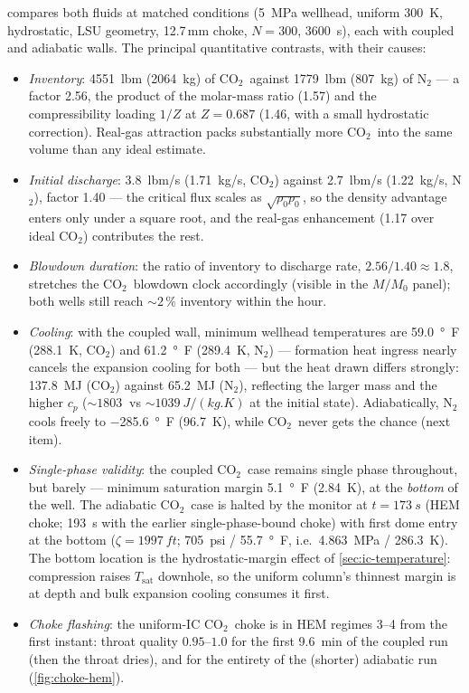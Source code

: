 \documentclass[11pt]{article}
\newcommand{\co}{CO$_2$}
\begin{document}
 compares both fluids at matched conditions
(\SI{5}{MPa} wellhead, uniform \SI{300}{K}, hydrostatic, LSU
geometry, 12.7\,mm choke, $N=300$, \SI{3600}{s}), each with coupled
and adiabatic walls. The principal quantitative contrasts, with their
causes:
\begin{itemize}
\item \emph{Inventory}: \SI{4551}{lbm} (\SI{2064}{kg}) of \co\
against \SI{1779}{lbm} (\SI{807}{kg}) of N$_2$ --- a factor 2.56,
the product of the molar-mass ratio
(1.57) and the compressibility loading $1/Z$ at $Z = 0.687$ (1.46,
with a small hydrostatic correction). Real-gas attraction packs
substantially more \co\ into the same volume than any ideal estimate.
\item \emph{Initial discharge}: \SI{3.8}{lbm/s} (\SI{1.71}{kg/s},
\co) against \SI{2.7}{lbm/s} (\SI{1.22}{kg/s}, N$_2$), factor 1.40
--- the critical flux scales as
$\sqrt{\rho_0 p_0}$, so the density advantage enters only under a
square root, and the real-gas enhancement (1.17 over ideal \co)
contributes the rest.
\item \emph{Blowdown duration}: the ratio of inventory to discharge
rate, $2.56/1.40 \approx 1.8$, stretches the \co\ blowdown clock
accordingly (visible in the $M/M_0$ panel); both wells still reach
${\sim}2\,\%$ inventory within the hour.
\item \emph{Cooling}: with the coupled wall, minimum wellhead
temperatures are \SI{59.0}{\degree F} (\SI{288.1}{K}, \co) and
\SI{61.2}{\degree F} (\SI{289.4}{K}, N$_2$) ---
formation heat ingress nearly cancels the expansion cooling for both
--- but the heat drawn differs strongly: \SI{137.8}{MJ} (\co) against
\SI{65.2}{MJ} (N$_2$), reflecting the larger mass and the higher
$c_p$ (${\sim}\SI{1803}{}$ vs ${\sim}\SI{1039}{J/(kg.K)}$ at the
initial state). Adiabatically, N$_2$ cools freely to
\SI{-285.6}{\degree F} (\SI{96.7}{K}), while \co\ never gets the
chance (next item).
\item \emph{Single-phase validity}: the coupled \co\ case remains
single phase throughout, but barely --- minimum saturation margin
\SI{5.1}{\degree F} (\SI{2.84}{K}), at the \emph{bottom} of the
well. The adiabatic \co\ case is halted by the monitor at
$t = \SI{173}{s}$ (HEM choke; 193~s with the earlier
single-phase-bound choke) with first dome entry at the bottom
($\zeta = \SI{1997}{ft}$; \SI{705}{psi} / \SI{55.7}{\degree F},
i.e.\ \SI{4.863}{MPa} / \SI{286.3}{K}). The bottom location is the
hydrostatic-margin effect of \cref{sec:ic-temperature}: compression
raises $T_{\mathrm{sat}}$ downhole, so the uniform column's thinnest
margin is at depth and bulk expansion cooling consumes it first.
\item \emph{Choke flashing}: the uniform-IC \co\ choke is in HEM
regimes 3--4 from the first instant: throat quality $0.95$--$1.0$ for
the first \SI{9.6}{min} of the coupled run (then the throat dries),
and for the entirety of the (shorter) adiabatic run
(\cref{fig:choke-hem}).
\end{itemize}
\end{document}
